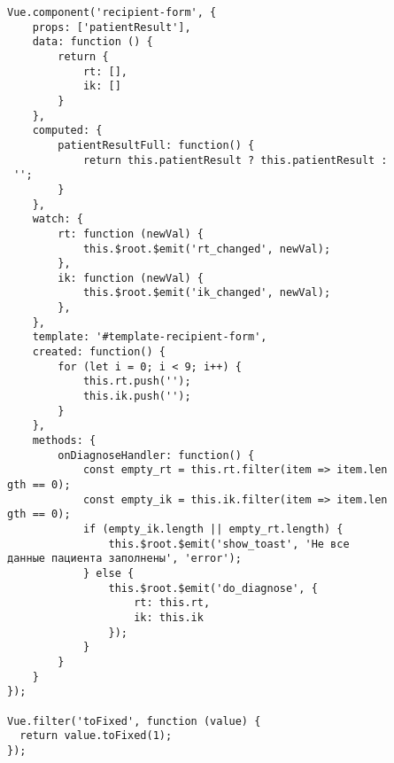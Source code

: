 \begin{verbatim}
Vue.component('recipient-form', {
    props: ['patientResult'],
    data: function () {
        return {
            rt: [],
            ik: []
        }
    },
    computed: {
        patientResultFull: function() {
            return this.patientResult ? this.patientResult :
 '';
        }
    },
    watch: {
        rt: function (newVal) {
            this.$root.$emit('rt_changed', newVal);
        },
        ik: function (newVal) {
            this.$root.$emit('ik_changed', newVal);
        },
    },
    template: '#template-recipient-form',
    created: function() {
        for (let i = 0; i < 9; i++) {
            this.rt.push('');
            this.ik.push('');
        }
    },
    methods: {
        onDiagnoseHandler: function() {
            const empty_rt = this.rt.filter(item => item.len
gth == 0);
            const empty_ik = this.ik.filter(item => item.len
gth == 0);
            if (empty_ik.length || empty_rt.length) {
                this.$root.$emit('show_toast', 'Не все 
данные пациента заполнены', 'error');
            } else {
                this.$root.$emit('do_diagnose', {
                    rt: this.rt,
                    ik: this.ik
                });
            }
        }
    }
});

Vue.filter('toFixed', function (value) {
  return value.toFixed(1);
});


\end{verbatim}
